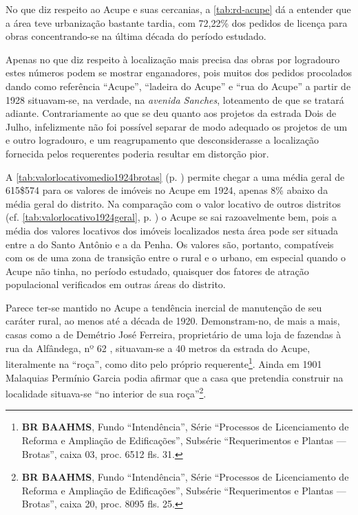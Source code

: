
No que diz respeito ao Acupe e suas cercanias, a \autoref{tab:rd-acupe} dá a entender que a área teve urbanização bastante tardia, com 72,22\% dos pedidos de licença para obras concentrando-se na última década do período estudado.





Apenas no que diz respeito à localização mais precisa das obras por logradouro estes números podem se mostrar enganadores, pois muitos dos pedidos procolados dando como referência ``Acupe'', ``ladeira do Acupe'' e ``rua do Acupe'' a partir de 1928 situavam-se, na verdade, na \textit{avenida Sanches}, loteamento de que se tratará adiante. Contrariamente ao que se deu quanto aos projetos da estrada Dois de Julho, infelizmente não foi possível separar de modo adequado os projetos de um e outro logradouro, e um reagrupamento que desconsiderasse a localização fornecida pelos requerentes poderia resultar em distorção pior.


A \autoref{tab:valorlocativomedio1924brotas} (p. \pageref{tab:valorlocativomedio1924brotas}) permite chegar a uma média geral de 615\$574 para os valores de imóveis no Acupe em 1924, apenas 8\% abaixo da média geral do distrito. Na comparação com o valor locativo de outros distritos (cf. \autoref{tab:valorlocativo1924geral}, p. \pageref{tab:valorlocativo1924geral}) o Acupe se sai razoavelmente bem, pois a média dos valores locativos dos imóveis localizados nesta área pode ser situada entre a do Santo Antônio e a da Penha. Os valores são, portanto, compatíveis com os de uma zona de transição entre o rural e o urbano, em especial quando o Acupe não tinha, no período estudado, quaisquer dos fatores de atração populacional verificados em outras áreas do distrito.


Parece ter-se mantido no Acupe a tendência inercial de manutenção de seu caráter rural, ao menos até a década de 1920. Demonstram-no, de mais a mais, casas como a de Demétrio José Ferreira, proprietário de uma loja de fazendas à rua da Alfândega, nº 62 \cite[p.~423]{reis_almanak_1898}, situavam-se a 40 metros da estrada do Acupe, literalmente na ``roça'', como dito pelo próprio requerente\footnote{\textbf{BR BAAHMS}, Fundo ``Intendência'', Série ``Processos de Licenciamento de Reforma e Ampliação de Edificações'', Subsérie ``Requerimentos e Plantas --- Brotas'', caixa 03, proc. 6512 fls. 31.}. Ainda em 1901 Malaquias Permínio Garcia podia afirmar que a casa que pretendia construir na localidade situava-se ``no interior de sua roça''\footnote{\textbf{BR BAAHMS}, Fundo ``Intendência'', Série ``Processos de Licenciamento de Reforma e Ampliação de Edificações'', Subsérie ``Requerimentos e Plantas --- Brotas'', caixa 20, proc. 8095 fls. 25.}. 
 


